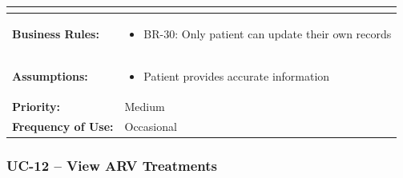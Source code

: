 \documentclass[12pt,a4paper]{article}
\begin{document}
\begin{longtable}{|p{4.5cm}|p{10.5cm}|}
\begin{itemize}
\end{itemize} \\
\hline
\textbf{Business Rules:} &
\begin{itemize}
  \item BR-30: Only patient can update their own records
\end{itemize} \\
\hline
\textbf{Assumptions:} &
\begin{itemize}
  \item Patient provides accurate information
\end{itemize} \\
\hline
\textbf{Priority:} & Medium \\
\hline
\textbf{Frequency of Use:} & Occasional \\
\hline
\end{longtable}

\subsubsection{UC-12 – View ARV Treatments}
\end{document}
